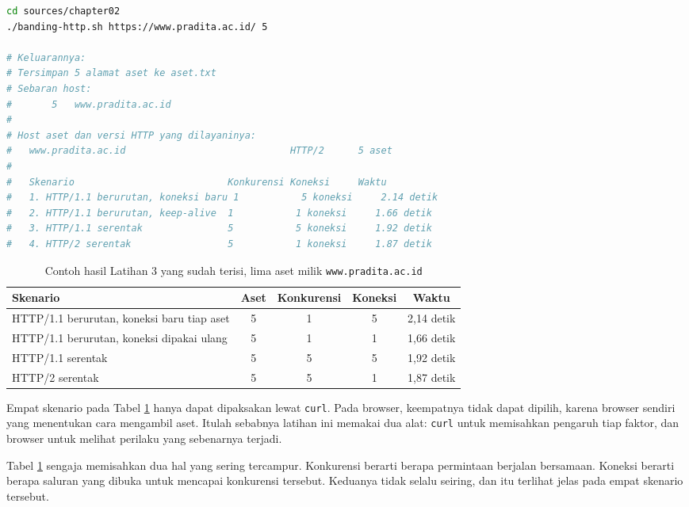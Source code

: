 \begin{lstlisting}[language=bash, caption={Menjalankan skrip pembanding pada aset milik situs kampus}, label={lst:lat2-jalan}]
cd sources/chapter02
./banding-http.sh https://www.pradita.ac.id/ 5

# Keluarannya:
# Tersimpan 5 alamat aset ke aset.txt
# Sebaran host:
#       5   www.pradita.ac.id
#
# Host aset dan versi HTTP yang dilayaninya:
#   www.pradita.ac.id                             HTTP/2      5 aset
#
#   Skenario                           Konkurensi Koneksi     Waktu
#   1. HTTP/1.1 berurutan, koneksi baru 1           5 koneksi     2.14 detik
#   2. HTTP/1.1 berurutan, keep-alive  1           1 koneksi     1.66 detik
#   3. HTTP/1.1 serentak               5           5 koneksi     1.92 detik
#   4. HTTP/2 serentak                 5           1 koneksi     1.87 detik
\end{lstlisting}

\begin{table}[!htb]
  \centering
  \caption{Contoh hasil Latihan 3 yang sudah terisi, lima aset milik
           \texttt{www.pradita.ac.id}}
  \label{tab:lat2-contoh}
  \begin{tabularx}{\textwidth}{Xcccc}
    \hline
    \textbf{Skenario} & \textbf{Aset} & \textbf{Konkurensi} & \textbf{Koneksi} & \textbf{Waktu} \\
    \hline
    HTTP/1.1 berurutan, koneksi baru tiap aset & 5 & 1 & 5 & 2,14 detik \\
    \hline
    HTTP/1.1 berurutan, koneksi dipakai ulang & 5 & 1 & 1 & 1,66 detik \\
    \hline
    HTTP/1.1 serentak & 5 & 5 & 5 & 1,92 detik \\
    \hline
    HTTP/2 serentak & 5 & 5 & 1 & 1,87 detik \\
    \hline
  \end{tabularx}
\end{table}

Empat skenario pada Tabel \ref{tab:lat2-contoh} hanya dapat dipaksakan lewat
\texttt{curl}. Pada browser, keempatnya tidak dapat dipilih, karena browser
sendiri yang menentukan cara mengambil aset. Itulah sebabnya latihan ini memakai
dua alat: \texttt{curl} untuk memisahkan pengaruh tiap faktor, dan browser untuk
melihat perilaku yang sebenarnya terjadi.

Tabel \ref{tab:lat2-contoh} sengaja memisahkan dua hal yang sering tercampur.
Konkurensi berarti berapa permintaan berjalan bersamaan. Koneksi berarti berapa
saluran yang dibuka untuk mencapai konkurensi tersebut. Keduanya tidak selalu
seiring, dan itu terlihat jelas pada empat skenario tersebut.

